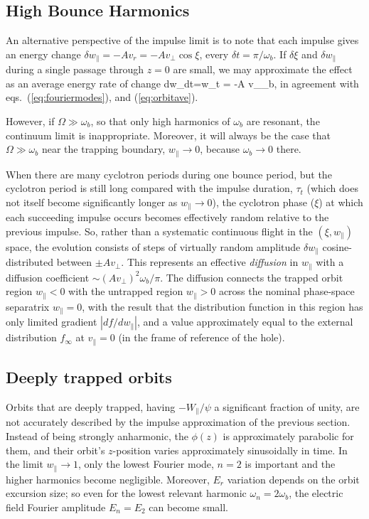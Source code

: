 \documentclass{agujournal2019}
\let\oldequation\equation
\let\oldendequation\endequation
\renewenvironment{equation}
  {\linenomathNonumbers\oldequation}
  {\oldendequation\endlinenomath}
\def\wp{w_\parallel}
\begin{document}
\subsection{High Bounce Harmonics}

An alternative perspective of the impulse limit is to note that each
impulse gives an energy change
$\delta \wp= -Av_r=-Av_\perp\cos\xi$, every
$\delta t=\pi/\omega_b$. If $\delta \xi$ and $\delta \wp$
during a single passage through $z=0$ are small, we may approximate the
effect as an average energy rate of change
\begin{equation}
  \label{eq:energychange}
  {d\wp\over dt}={\delta \wp\over\delta t} 
    = -{A v_\perp \omega_b\over \pi}\cos\xi,
\end{equation}
in agreement with eqs.\ (\ref{eq:fouriermodes}), and  
(\ref{eq:orbitave}).

However, if $\Omega\gg\omega_b$, so that only high harmonics of
$\omega_b$ are resonant, the continuum limit is
inappropriate. Moreover, it will always be the case that
$\Omega\gg\omega_b$ near the trapping boundary, $\wp\to 0$, because
$\omega_b\to 0$ there.

When there are many cyclotron periods during one bounce
period, but the cyclotron period is still long compared with the
impulse duration, $\tau_t$ (which does not itself become significantly longer as
$\wp\to 0$), the cyclotron phase ($\xi$) at which each succeeding impulse occurs
becomes effectively random relative to the previous
impulse. So, rather than a systematic continuous flight in the
$(\xi,\wp)$ space, the evolution consists of steps of
virtually random amplitude $\delta \wp$ cosine-distributed
between $\pm Av_\perp$. This represents an effective \emph{diffusion} in
$\wp$ with a diffusion coefficient $\sim(Av_\perp)^2\omega_b/\pi$.
The diffusion connects the trapped orbit region $\wp <0$ with
the untrapped region $\wp >0$ across the nominal phase-space
separatrix $\wp=0$, with the result that the distribution
function in this region has only limited gradient $|df/d\wp|$,
and a value approximately equal to the external distribution
$f_\infty$ at $v_\parallel=0$ (in the frame of reference of the hole).

\subsection{Deeply trapped orbits}

Orbits that are deeply trapped, having $-W_\parallel/\psi$ a
significant fraction of unity, are not accurately described by the
impulse approximation of the previous section. Instead of being
strongly anharmonic, the $\phi(z)$ is approximately parabolic for
them, and their orbit's $z$-position varies approximately sinusoidally
in time. In the limit $\wp\to 1$, only the lowest Fourier
mode, $n=2$ is important and the higher harmonics become
negligible. Moreover, $E_r$ variation depends on the orbit excursion
size; so even for the lowest relevant harmonic $\omega_n=2\omega_b$,
the electric field Fourier amplitude $E_n=E_2$ can become small.
\end{document}
